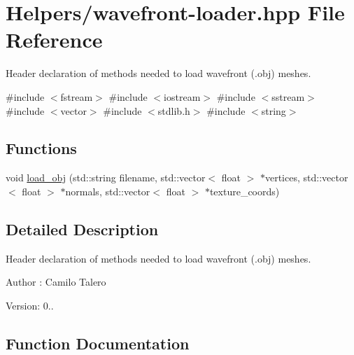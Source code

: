 \hypertarget{wavefront-loader_8hpp}{}\section{Helpers/wavefront-\/loader.hpp File Reference}
\label{wavefront-loader_8hpp}


Header declaration of methods needed to load wavefront (.obj) meshes.  


{\ttfamily \#include $<$fstream$>$}\newline
{\ttfamily \#include $<$iostream$>$}\newline
{\ttfamily \#include $<$sstream$>$}\newline
{\ttfamily \#include $<$vector$>$}\newline
{\ttfamily \#include $<$stdlib.\+h$>$}\newline
{\ttfamily \#include $<$string$>$}\newline
\subsection*{Functions}
\begin{DoxyCompactItemize}
\item 
void \mbox{\hyperlink{wavefront-loader_8hpp_a545203558434ccbdf58e4fa3505153a6}{load\+\_\+obj}} (std\+::string filename, std\+::vector$<$ float $>$ $\ast$vertices, std\+::vector$<$ float $>$ $\ast$normals, std\+::vector$<$ float $>$ $\ast$texture\+\_\+coords)
\end{DoxyCompactItemize}


\subsection{Detailed Description}
Header declaration of methods needed to load wavefront (.obj) meshes. 

\begin{DoxyAuthor}{Author}
\+: Camilo Talero
\end{DoxyAuthor}
Version\+: 0.. 

\subsection{Function Documentation}
\mbox{\label{wavefront-loader_8hpp_a545203558434ccbdf58e4fa3505153a6}} 
